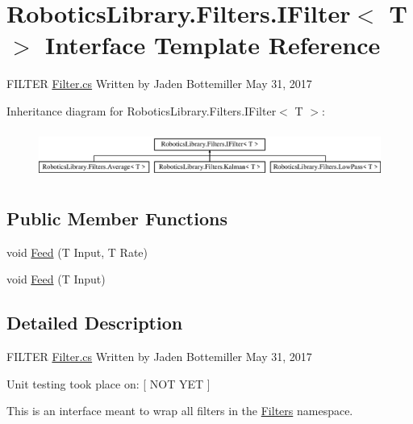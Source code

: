 \hypertarget{interface_robotics_library_1_1_filters_1_1_i_filter}{}\section{Robotics\+Library.\+Filters.\+I\+Filter$<$ T $>$ Interface Template Reference}
\label{interface_robotics_library_1_1_filters_1_1_i_filter}


F\+I\+L\+T\+ER \hyperlink{_filter_8cs}{Filter.\+cs} Written by Jaden Bottemiller May 31, 2017  


Inheritance diagram for Robotics\+Library.\+Filters.\+I\+Filter$<$ T $>$\+:\begin{figure}[H]
\begin{center}
\leavevmode
\includegraphics[height=1.602289cm]{d2/dbd/interface_robotics_library_1_1_filters_1_1_i_filter}
\end{center}
\end{figure}
\subsection*{Public Member Functions}
\begin{DoxyCompactItemize}
\item 
void \hyperlink{interface_robotics_library_1_1_filters_1_1_i_filter_a24d363fb2957923a256448e04634d9ca}{Feed} (T Input, T Rate)
\item 
void \hyperlink{interface_robotics_library_1_1_filters_1_1_i_filter_a64855020add7b0354c2773696521c84e}{Feed} (T Input)
\end{DoxyCompactItemize}


\subsection{Detailed Description}
F\+I\+L\+T\+ER \hyperlink{_filter_8cs}{Filter.\+cs} Written by Jaden Bottemiller May 31, 2017 

Unit testing took place on\+: \mbox{[} N\+OT Y\+ET \mbox{]}

This is an interface meant to wrap all filters in the \hyperlink{namespace_robotics_library_1_1_filters}{Filters} namespace.


